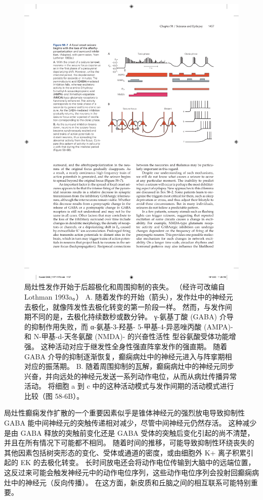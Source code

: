 \begin{figure}[htbp]
	\centering
	\includegraphics[width=0.7\linewidth]{chap58/fig_58_7}
	\caption{局灶性发作开始于后超极化和周围抑制的丧失。 （经许可改编自 Lothman 1993a。） A. 随着发作的开始（箭头），发作灶中的神经元去极化，就像阵发性去极化转变的第一阶段一样。 然而，与发作间期不同的是，去极化持续数秒或数分钟。 γ-氨基丁酸 (GABA) 介导的抑制作用失败，而 α-氨基-3-羟基- 5-甲基-4-异恶唑丙酸 (AMPA)- 和 N-甲基-d-天冬氨酸 (NMDA)- 的兴奋性活性 型谷氨酸受体功能增强。 这种活动对应于继发性全身性强直阵挛发作的强直期。 随着 GABA 介导的抑制逐渐恢复，癫痫病灶中的神经元进入与阵挛期相对应的振荡期。 B. 随着周围抑制的瓦解，癫痫病灶中的神经元同步兴奋，并向远处的神经元发送一系列动作电位，从而从病灶传播异常活动。 将细胞 a 到 c 中的这种活动模式与发作间期的活动模式进行比较（图 58-6B）。}
	\label{fig:58_7}
\end{figure}


局灶性癫痫发作扩散的一个重要因素似乎是锥体神经元的强烈放电导致抑制性 GABA 能中间神经元的突触传递相对减少，尽管中间神经元仍然存活。
这种减少是由 GABA 释放的突触前变化还是 GABA 受体的突触后变化引起的尚不清楚，并且在所有情况下可能都不相同。
随着时间的推移，可能导致抑制性环绕丧失的其他因素包括树突形态的变化、受体或通道的密度，或由细胞外 K+ 离子积累引起的 EK 的去极化转变。
长时间放电还会将动作电位传输到大脑中的远端位置，这反过来可能会触发神经元中的动作电位序列，这些动作电位序列会投射回癫痫病灶中的神经元（反向传播）。
在这方面，新皮质和丘脑之间的相互联系可能特别重要。


